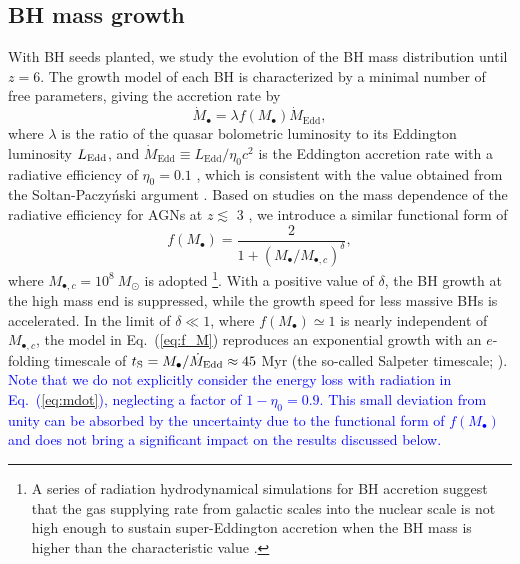 \documentclass[twocolumn, twocolappendix]{aastex63}
\newcommand{\Msun}{M_\odot}
\newcommand{\Mbh}{M_\bullet}
\newcommand{\Mdot}{\dot{M}}
\newcommand{\blue}[1]{\textcolor{blue}{ #1}}
\begin{document}
\begin{CJK*}{UTF8}{gbsn}
\vspace{2mm}
\subsection{BH mass growth}
\label{sec:model}
With BH seeds planted, we study the evolution of the BH mass distribution until $z=6$. 
The growth model of each BH is characterized by a minimal number of free parameters, 
giving the accretion rate by
%
\begin{equation}
  \label{eq:mdot}
  \Mdot_\bullet = \lambda f(\Mbh) \Mdot_\mathrm{Edd} ,
\end{equation}
where $\lambda$ is the ratio of the quasar bolometric luminosity to its Eddington luminosity $L_{\rm Edd}$,
and $\Mdot_\mathrm{Edd} \equiv L_{\mathrm{Edd}}/\eta_0 c^2$ is the Eddington accretion rate with a radiative efficiency of $\eta_0=0.1$ \citep{1973A&A....24..337S},
which is consistent with the value obtained from the Soltan-Paczy{\'n}ski argument \citep[e.g.,][]{2002MNRAS.335..965Y,2010ApJ...725..388C}.
Based on studies on the mass dependence of the radiative efficiency for AGNs at $z\lesssim$ 3 
\citep{2008MNRAS.390..561C,2012ApJ...749..187L,2014ApJ...786..104U}, 
we introduce a similar functional form of
%
\begin{equation}
\label{eq:f_M}
f(\Mbh) = \frac{2}{1+\left(\Mbh /M_{\bullet,c} \right)^\delta}, 
\end{equation}
%
where $M_{\bullet,c}=10^8~\Msun$ is adopted
\footnote{
A series of radiation hydrodynamical simulations for BH accretion
suggest that the gas supplying rate from galactic scales into the nuclear scale is not high enough to sustain 
super-Eddington accretion when the BH mass is higher than the characteristic value \citep{2021ApJ...907...74T}.}.
With a positive value of $\delta$, the BH growth at the high mass end is suppressed,
while the growth speed for less massive BHs is accelerated.
In the limit of $\delta \ll 1$, where $f(\Mbh) \simeq 1$ is nearly independent of $M_{\bullet,c}$,
the model in Eq.~(\ref{eq:f_M}) reproduces an exponential growth with an $e$-folding timescale of
$t_{\rm S} =  \Mbh/\Mdot_{\mathrm{Edd}} \approx 45$ Myr (the so-called Salpeter timescale; \citealt{1964ApJ...140..796S}).
\blue{
Note that we do not explicitly consider the energy loss with radiation in Eq.~(\ref{eq:mdot}), neglecting a factor of $1-\eta_0=0.9$.
This small deviation from unity can be absorbed by the uncertainty due to the functional form of $f(M_\bullet)$ and does not bring 
a significant impact on the results discussed below.
}





\end{CJK*}
\end{document}
